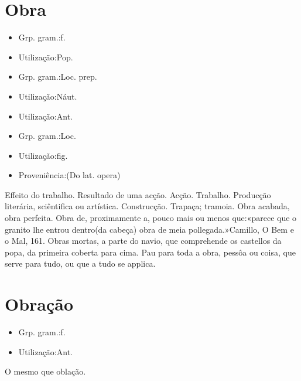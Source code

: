 \section{Obra}
\begin{itemize}
\item {Grp. gram.:f.}
\end{itemize}
\begin{itemize}
\item {Utilização:Pop.}
\end{itemize}
\begin{itemize}
\item {Grp. gram.:Loc. prep.}
\end{itemize}
\begin{itemize}
\item {Utilização:Náut.}
\end{itemize}
\begin{itemize}
\item {Utilização:Ant.}
\end{itemize}
\begin{itemize}
\item {Grp. gram.:Loc.}
\end{itemize}
\begin{itemize}
\item {Utilização:fig.}
\end{itemize}
\begin{itemize}
\item {Proveniência:(Do lat. \textunderscore opera\textunderscore )}
\end{itemize}
Effeito do trabalho.
Resultado de uma acção.
Acção.
Trabalho.
Producção literária, sciêntifica ou artística.
Construcção.
Trapaça; tramoia.
\textunderscore Obra acabada\textunderscore , obra perfeita.
\textunderscore Obra de\textunderscore , proximamente a, pouco mais ou menos que:«\textunderscore parece que o granito lhe entrou dentro\textunderscore  (da cabeça) \textunderscore obra de meia pollegada.\textunderscore »Camillo, \textunderscore O Bem e o Mal\textunderscore , 161.
\textunderscore Obras mortas\textunderscore , a parte do navio, que comprehende os castellos da popa, da primeira coberta para cima.
\textunderscore Pau para toda a obra\textunderscore , pessôa ou coisa, que serve para tudo, ou que a tudo se applica.
\section{Obração}
\begin{itemize}
\item {Grp. gram.:f.}
\end{itemize}
\begin{itemize}
\item {Utilização:Ant.}
\end{itemize}
O mesmo que \textunderscore oblação\textunderscore .
